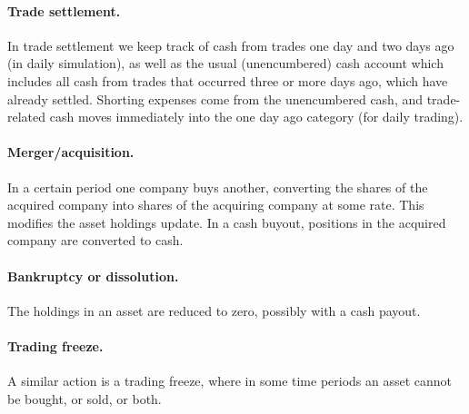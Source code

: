 \documentclass[openany]{article}  %
\begin{document}
\paragraph{Trade settlement.}
In trade settlement we keep track of cash from trades one day and two days
ago (in daily simulation),
as well as the usual (unencumbered) cash account
which includes all cash from trades that occurred three or more
days ago, which have already settled.
Shorting expenses come from the unencumbered cash, and trade-related
cash moves immediately into the one day ago category (for daily trading).



\paragraph{Merger/acquisition.}
In a certain period one company buys another, converting the
shares of the acquired
company into shares of the acquiring company at some rate.
This modifies the asset holdings update.  In a cash buyout, positions in the
acquired company are converted to cash.

\paragraph{Bankruptcy or dissolution.}
The holdings in an asset are reduced to zero, possibly with a cash payout.

\paragraph{Trading freeze.}
A similar action is a trading freeze,
where in some time periods an asset cannot be bought, or sold, or both.
\end{document}

